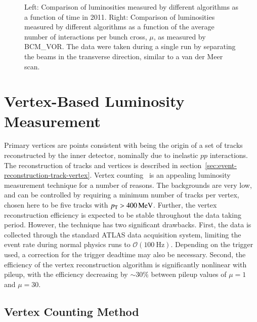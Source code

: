 \begin{figure}
{	}
	\hfill
	\caption{Left:  Comparison of luminosities measured by different algorithms as a function of time in 2011. Right:  Comparison of luminosities measured by different algorithms as a function of the average number of interactions per bunch cross, $\mu$, as measured by BCM\_VOR. The data were taken during a single run by separating the beams in the transverse direction, similar to a van der Meer scan.}
	\label{fig:reco-luminosity-comparisons}
\end{figure}

\section{Vertex-Based Luminosity Measurement}\label{sec:luminosity-vertex}

Primary vertices are points consistent with being the origin of a set of tracks reconstructed by the inner detector, nominally due to inelastic $pp$ interactions. The reconstruction of tracks and vertices is described in section~\ref{sec:event-reconstruction-track-vertex}. Vertex counting~\cite{PaganGriso:2013wn} is an appealing luminosity measurement technique for a number of reasons. The backgrounds are very low, and can be controlled by requiring a minimum number of tracks per vertex, chosen here to be five tracks with $p_{\text{T}}>\SI{400}{\mega\electronvolt}$. Further, the vertex reconstruction efficiency is expected to be stable throughout the data taking period. However, the technique has two significant drawbacks. First, the data is collected through the standard ATLAS data acquisition system, limiting the event rate during normal physics runs to $\mathcal{O}(\SI{100}{\hertz})$. Depending on the trigger used, a correction for the trigger deadtime may also be necessary. Second, the efficiency of the vertex reconstruction algorithm is significantly nonlinear with pileup, with the efficiency decreasing by $\sim30\%$ between pileup values of $\mu=1$ and $\mu=30$. 

\subsection{Vertex Counting Method}\label{sec:luminosity-vertex-method}


